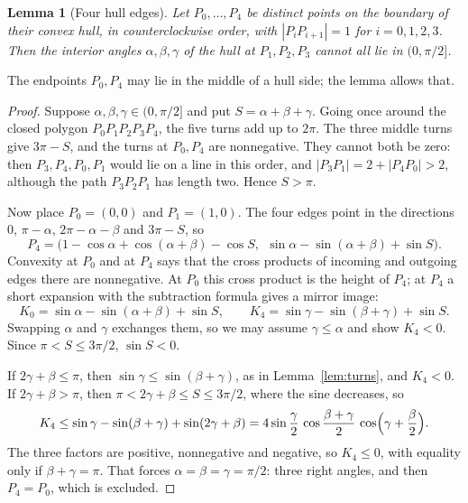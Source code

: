 \documentclass[11pt]{article}
\newtheorem{lemma}{Lemma}
\theoremstyle{remark}
\begin{document}
\begin{lemma}[Four hull edges]\label{lem:fourhull}
Let $P_0,\dots,P_4$ be distinct points on the boundary of their convex hull, in
counterclockwise order, with $|P_iP_{i+1}|=1$ for $i=0,1,2,3$. Then the interior angles
$\alpha,\beta,\gamma$ of the hull at $P_1,P_2,P_3$ cannot all lie in $(0,\pi/2]$.
\end{lemma}

The endpoints $P_0,P_4$ may lie in the middle of a hull side; the lemma allows that.

\begin{proof}
Suppose $\alpha,\beta,\gamma\in(0,\pi/2]$ and put $S=\alpha+\beta+\gamma$. Going once around the
closed polygon $P_0P_1P_2P_3P_4$, the five turns add up to $2\pi$. The three middle turns
give $3\pi-S$, and the turns at $P_0,P_4$ are nonnegative. They cannot both be zero:
then $P_3,P_4,P_0,P_1$ would lie on a line in this order, and $|P_3P_1|=2+|P_4P_0|>2$,
although the path $P_3P_2P_1$ has length two. Hence $S>\pi$.

Now place $P_0=(0,0)$ and $P_1=(1,0)$. The four edges point in the directions $0$,
$\pi-\alpha$, $2\pi-\alpha-\beta$ and $3\pi-S$, so
\[
  P_4=\bigl(1-\cos\alpha+\cos(\alpha+\beta)-\cos S,\ \ \sin\alpha-\sin(\alpha+\beta)+\sin S\bigr).
\]
Convexity at $P_0$ and at $P_4$ says that the cross products of incoming and outgoing
edges there are nonnegative. At $P_0$ this cross product is the height of $P_4$; at
$P_4$ a short expansion with the subtraction formula gives a mirror image:
\begin{equation}\label{eq:K}
  K_0=\sin\alpha-\sin(\alpha+\beta)+\sin S,\qquad K_4=\sin\gamma-\sin(\beta+\gamma)+\sin S.
\end{equation}
Swapping $\alpha$ and $\gamma$ exchanges them, so we may assume $\gamma\le\alpha$ and show
$K_4<0$. Since $\pi<S\le3\pi/2$, $\sin S<0$.

If $2\gamma+\beta\le\pi$, then $\sin\gamma\le\sin(\beta+\gamma)$, as in Lemma~\ref{lem:turns},
and $K_4<0$. If $2\gamma+\beta>\pi$, then $\pi<2\gamma+\beta\le S\le3\pi/2$, where the sine
decreases, so
\[
  K_4\le\sin\gamma-\sin(\beta+\gamma)+\sin(2\gamma+\beta)
  =4\sin\frac{\gamma}{2}\,\cos\frac{\beta+\gamma}{2}\,\cos\Bigl(\gamma+\frac{\beta}{2}\Bigr).
\]
The three factors are positive, nonnegative and negative, so $K_4\le0$, with equality
only if $\beta+\gamma=\pi$. That forces $\alpha=\beta=\gamma=\pi/2$: three right angles, and then
$P_4=P_0$, which is excluded.
\end{proof}
\end{document}
